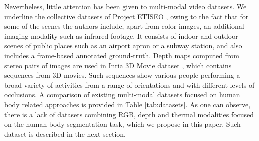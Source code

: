 \documentclass[10pt,twocolumn,letterpaper]{article}
\begin{document}
Nevertheless, little attention has been given to multi-modal video datasets. We underline the collective datasets of Project ETISEO \cite{nghiem2007etiseo}, owing to the fact that for some of the scenes the authors include, apart from color images, an additional imaging modality such as infrared footage. It consists of indoor and outdoor scenes of public places such as an airport apron or a subway station, and also includes a frame-based annotated ground-truth. Depth maps computed from stereo pairs of images are used in Inria 3D Movie dataset \cite{alahari2013pose}, which contains sequences from 3D movies. Such sequences show various people performing a broad variety of activities from a range of orientations and with different levels of occlusions. A comparison of existing multi-modal datasets focused on human body related approaches is provided in Table \ref{tab:datasets}. As one can observe, there is a lack of datasets combining RGB, depth and thermal modalities focused on the human body segmentation task, which we propose in this paper. Such dataset is described in the next section.  
\end{document}
